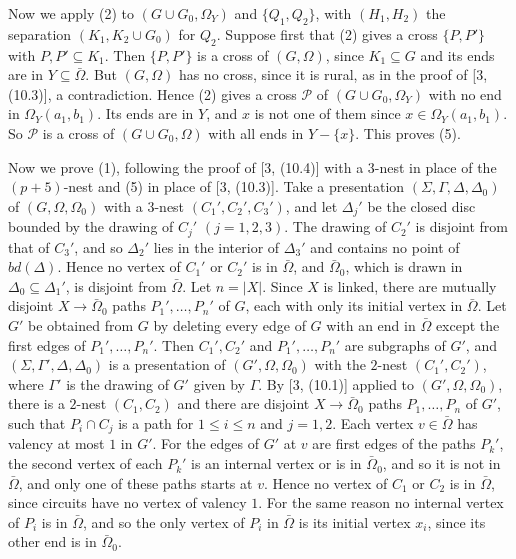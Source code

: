 {Now we apply (2) to $(G \cup G_0, \Omega_Y)$ and $\{Q_1, Q_2\}$, with $(H_1, H_2)$ the separation $(K_1, K_2 \cup G_0)$ for $Q_2$. Suppose first that (2) gives a cross $\{P, P'\}$ with $P, P' \subseteq K_1$. Then $\{P, P'\}$ is a cross of $(G, \Omega)$, since $K_1 \subseteq G$ and its ends are in $Y \subseteq \bar{\Omega}$. But $(G, \Omega)$ has no cross, since it is rural, as in the proof of [3, (10.3)], a contradiction. Hence (2) gives a cross $\mathscr{P}$ of $(G \cup G_0, \Omega_Y)$ with no end in $\Omega_Y(a_1, b_1)$. Its ends are in $Y$, and $x$ is not one of them since $x \in \Omega_Y(a_1, b_1)$. So $\mathscr{P}$ is a cross of $(G \cup G_0, \Omega)$ with all ends in $Y - \{x\}$. This proves (5).

Now we prove (1), following the proof of [3, (10.4)] with a $3$-nest in place of the $(p + 5)$-nest and (5) in place of [3, (10.3)]. Take a presentation $(\Sigma, \Gamma, \Delta, \Delta_0)$ of $(G, \Omega, \Omega_0)$ with a $3$-nest $(C_1', C_2', C_3')$, and let $\Delta_j'$ be the closed disc bounded by the drawing of $C_j'$ $(j = 1, 2, 3)$. The drawing of $C_2'$ is disjoint from that of $C_3'$, and so $\Delta_2'$ lies in the interior of $\Delta_3'$ and contains no point of $bd(\Delta)$. Hence no vertex of $C_1'$ or $C_2'$ is in $\bar{\Omega}$, and $\bar{\Omega}_0$, which is drawn in $\Delta_0 \subseteq \Delta_1'$, is disjoint from $\bar{\Omega}$. Let $n = |X|$. Since $X$ is linked, there are mutually disjoint $X \to \bar{\Omega}_0$ paths $P_1', \dots, P_n'$ of $G$, each with only its initial vertex in $\bar{\Omega}$. Let $G'$ be obtained from $G$ by deleting every edge of $G$ with an end in $\bar{\Omega}$ except the first edges of $P_1', \dots, P_n'$. Then $C_1', C_2'$ and $P_1', \dots, P_n'$ are subgraphs of $G'$, and $(\Sigma, \Gamma', \Delta, \Delta_0)$ is a presentation of $(G', \Omega, \Omega_0)$ with the $2$-nest $(C_1', C_2')$, where $\Gamma'$ is the drawing of $G'$ given by $\Gamma$. By [3, (10.1)] applied to $(G', \Omega, \Omega_0)$, there is a $2$-nest $(C_1, C_2)$ and there are disjoint $X \to \bar{\Omega}_0$ paths $P_1, \dots, P_n$ of $G'$, such that $P_i \cap C_j$ is a path for $1 \le i \le n$ and $j = 1, 2$. Each vertex $v \in \bar{\Omega}$ has valency at most $1$ in $G'$. For the edges of $G'$ at $v$ are first edges of the paths $P_k'$, the second vertex of each $P_k'$ is an internal vertex or is in $\bar{\Omega}_0$, and so it is not in $\bar{\Omega}$, and only one of these paths starts at $v$. Hence no vertex of $C_1$ or $C_2$ is in $\bar{\Omega}$, since circuits have no vertex of valency $1$. For the same reason no internal vertex of $P_i$ is in $\bar{\Omega}$, and so the only vertex of $P_i$ in $\bar{\Omega}$ is its initial vertex $x_i$, since its other end is in $\bar{\Omega}_0$.

}
